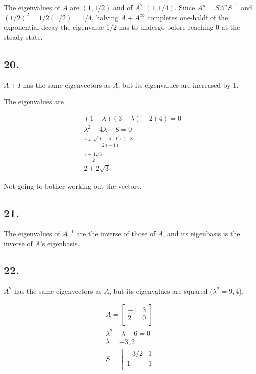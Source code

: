 \documentclass[
]{article}
\begin{document}
The eigenvalues of \(A\) are \((1, 1/2)\) and of \(A^2\) \((1, 1/4)\).
Since \(A^n = S \Lambda^n S^{-1}\) and \((1/2)^2 = 1/2(1/2) = 1/4\),
halving \(A + A^{\infty}\) completes one-haldf of the exponential decay
the eigenvalue \(1/2\) has to undergo before reaching 0 at the steady
state.

\hypertarget{section-17}{%
\subsection{20.}\label{section-17}}

\(A +I\) has the same eigenvectors as \(A\), but its eigenvalues are
increased by 1.

The eigenvalues are

\[
  \begin{aligned}
    & (1- \lambda)(3 - \lambda) - 2(4) = 0\\
    & \lambda^2 - 4 \lambda - 8 =0\\
    & \frac{4 \pm \sqrt{16 - 4(1)(-8)}}{2(-4)}\\
    & \frac{4 \pm 4 \sqrt{3}}{2}\\
    & 2 \pm 2 \sqrt{3}
  \end{aligned}
\]

Not going to bother working out the vectors.

\hypertarget{section-18}{%
\subsection{21.}\label{section-18}}

The eigenvalues of \(A^{-1}\) are the inverse of those of \(A\), and its
eigenbasis is the inverse of \(A\)'s eigenbasis.

\hypertarget{section-19}{%
\subsection{22.}\label{section-19}}

\(A^2\) has the same eigenvectors as \(A\), but its eigenvalues are
squared (\(\lambda^2 = 9, 4\)).

\[
  \begin{aligned}
    & A = \begin{bmatrix}
      -1 & 3\\
      2 & 0\\
    \end{bmatrix}\\
    & \lambda^2 + \lambda - 6 = 0\\
    & \lambda = -3, 2\\
    & S = \begin{bmatrix}
      -3/2 & 1\\
      1& 1\\
    \end{bmatrix}
  \end{aligned}
\]
\end{document}
